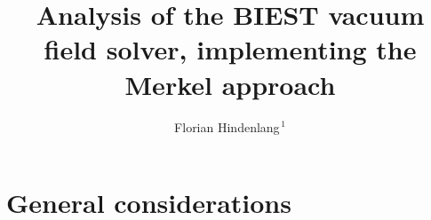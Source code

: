 \documentclass[aspectratio=169]{beamer}
\begin{document}
\title{Analysis of the BIEST vacuum field solver, implementing the Merkel approach}
 \author{ Florian Hindenlang$^{\,1}$}
 \date{ } 


 
{
\begin{frame}
\titlepage
\end{frame} }
 \addtocounter{framenumber}{-1}


\logo{}




\section{General considerations}
\end{document}
